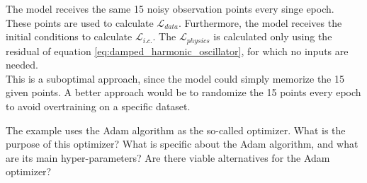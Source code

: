 \documentclass[we,twoside,openright,a4paper,11pt]{uantwerpenbamathesis}
\begin{document}
The model receives the same 15 noisy observation points every singe epoch. These points are used to calculate $\mathcal{L}_{data}$. Furthermore, the model receives the initial conditions to calculate $\mathcal{L}_{i.c.}$. The $\mathcal{L}_{physics}$ is calculated only using the residual of equation \ref{eq:damped_harmonic_oscillator}, for which no inputs are needed.\\

This is a suboptimal approach, since the model could simply memorize the 15 given points. A better approach would be to randomize the 15 points every epoch to avoid overtraining on a specific dataset. 


\begin{tcolorbox}[title=Question 6, colback=blue!10!white, colframe=blue!40!white, sharp corners]
    The example uses the Adam algorithm as the so-called optimizer. What is the purpose of this optimizer? What is specific about the Adam algorithm, and what are its main hyper-parameters? Are there viable alternatives for the Adam optimizer?
\end{tcolorbox}
\end{document}
